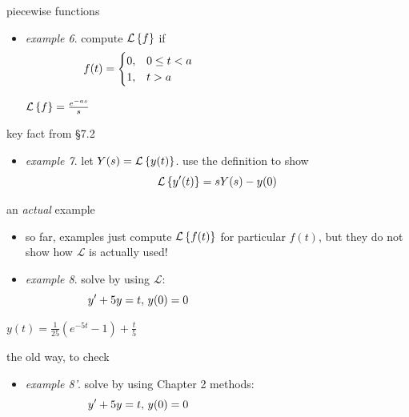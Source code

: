 \documentclass[dvipsnames,colorlinks]{beamer}
\begin{document}
\begin{frame}{piecewise functions}

\begin{itemize}
\item \emph{example 6}.  compute $\mathcal{L}\left\{f\right\}$ if
    $$f(t) = \begin{cases} 0, & 0 \le t < a \\
                           1, & t > a \end{cases} \hspace{50mm}$$

\vspace{35mm}
\hfill $\mathcal{L}\left\{f\right\} = \frac{e^{-as}}{s}$
\end{itemize}
\end{frame}


\begin{frame}{key fact from \S 7.2}

\begin{itemize}
\item \emph{example 7}.  let $Y(s) = \mathcal{L}\left\{y(t)\right\}$.  use the definition to show
    $$\mathcal{L}\left\{y'(t)\right\} = s Y(s) - y(0)$$

\vspace{50mm}
\end{itemize}
\end{frame}


\begin{frame}{an \emph{actual} example}

\begin{itemize}
\item so far, examples just compute $\mathcal{L}\left\{f(t)\right\}$ for particular $f(t)$, but they do not show how $\mathcal{L}$ is actually used!
\item \emph{example 8}.  solve by using $\mathcal{L}$:
    $$y'+5y=t, \,y(0)=0 \hspace{50mm}$$
\end{itemize}

\vspace{40mm}
\hfill \footnotesize $y(t) = \frac{1}{25} (e^{-5t} - 1) + \frac{t}{5}$
\end{frame}


\begin{frame}{the old way, to check}

\begin{itemize}
\item \emph{example 8'}.  solve by using Chapter 2 methods:
    $$y'+5y=t, \,y(0)=0 \hspace{50mm}$$
\end{itemize}

\vspace{60mm}
\end{frame}
\end{document}
